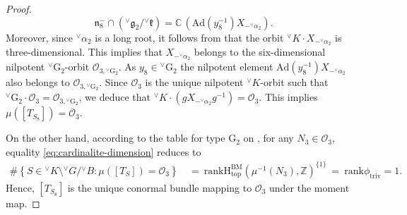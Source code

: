\documentclass[a4paper, 11pt]{article}
\begin{document}
\begin{proof}
$$
\mathfrak{n}_8^-\cap  ({}^\vee\mathfrak{g}_2/{}^\vee\mathfrak{k}) =
\mathbb{C}\, (\mathrm{Ad}(y_{8}^{-1})X_{-{}^\vee\alpha_2}). 
$$
Moreover, since ${}^\vee\alpha_2$ is a long root, it follows from
\cite[Table 1]{Dokovic} that the orbit ${{}^\vee K\cdot
  X_{-{}^\vee\alpha_2}}$ is three-dimensional. This implies that
$X_{-{}^\vee\alpha_2}$ belongs to the six-dimensional nilpotent
${}^{\vee}\mathrm{G}_{2}$-orbit $\mathcal{O}_{3,
  {^\vee}\mathrm{G}_{2}}$.   As
$y_{8} \in {^\vee}\mathrm{G}_{2}$ the 
nilpotent element  $\mathrm{Ad}(y_{8}^{-1})X_{-{}^\vee\alpha_2}$ also
belongs to $\mathcal{O}_{3, {^\vee}\mathrm{G}_{2}}$. 
Since $\mathcal{O}_3$ is the unique nilpotent ${}^{\vee}K$-orbit such
that ${}^{\vee}\mathrm{G}_{2}\cdot \mathcal{O}_3 = \mathcal{O}_{3,
  {^\vee}\mathrm{G}_{2}}$, we deduce that ${}^{\vee}K \cdot
(gX_{-{}^\vee\alpha_2}g^{-1}) = \mathcal{O}_3$. 
This implies  $\mu([T_{S_8}]) = \overline{\mathcal{O}}_3$.

On the other hand, according to the table for type \( \mathrm{G}_{2}
\) on \cite[page 427]{Carter85},  
for any $N_3\in\mathcal{O}_3$, equality 
\eqref{eq:cardinalite-dimension} reduces to
\begin{align*}
\#\left\{ S \in {}^\vee K \setminus {}^\vee G / {}^\vee B : \mu([T_S])
= \mathcal{O}_3 \right\} 
\ &=\  \mathrm{rank}
\mathrm{H}_{\mathrm{top}}^{\mathrm{BM}}(\mu^{-1}(N_3), \mathbb{Z})^{\{1\}} 
\ =\ \mathrm{rank} \phi_{\mathrm{triv}}= 1.
\end{align*}
Hence, $[T_{S_8}]$ is the unique conormal bundle mapping to
$\mathcal{O}_3$ under the moment map. 


\end{proof}
\end{document}
